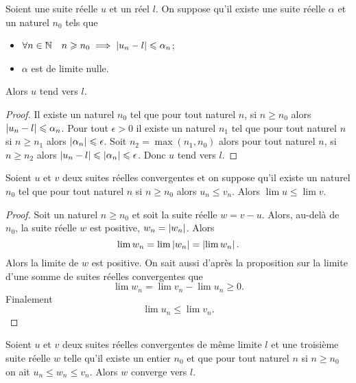 \begin{prop}
  Soient une suite réelle \(u\) et un réel \(l\). On suppose qu'il existe une suite réelle \(\alpha\) et un naturel \(n_0\) tels que
  \begin{itemize}
  \item \(\forall n \in \mathbb{N} \quad n \geqslant n_0 \implies \left\lvert u_n-l\right\rvert \leqslant \alpha_n\);
  \item \(\alpha\) est de limite nulle.
  \end{itemize}
  Alors \(u\) tend vers \(l\).
\end{prop}
\begin{proof}
  Il existe un naturel \(n_0\) tel que pour tout naturel \(n\), si \(n \geqslant n_0\) alors \(\left\lvert u_n-l\right\rvert \leqslant \alpha_n\). Pour tout \(\epsilon>0\) il existe un naturel \(n_1\) tel que pour tout naturel \(n\) si \(n\geqslant n_1\) alors \(\left\lvert\alpha_n\right\rvert \leqslant \epsilon\). Soit \(n_2=\max(n_1,n_0)\) alors pour tout naturel \(n\), si \(n \geqslant n_2\) alors \(\left\lvert u_n-l\right\rvert\leqslant \left\lvert\alpha_n\right\rvert\leqslant \epsilon\). Donc \(u\) tend vers \(l\).
\end{proof}
\begin{prop}
  Soient \(u\) et \(v\) deux suites réelles convergentes et on suppose qu'il existe un naturel \(n_0\) tel que pour tout naturel \(n\) si \(n \geqslant n_0\) alors \(u_n \leqslant v_n\). Alors \(\lim u \leqslant \lim v\).
\end{prop}
\begin{proof}
  Soit un naturel \(n \geqslant n_0\) et soit la suite réelle \(w=v-u\). Alors, au-delà de \(n_0\), la suite réelle \(w\) est positive, \(w_n=\left\lvert w_n\right\rvert\). Alors
  \begin{equation}
    \lim w_n=\lim \left\lvert w_n\right\rvert=\left\lvert\lim w_n\right\rvert.
  \end{equation}
Alors la limite de \(w\) est positive. On sait aussi d'après la proposition sur la limite d'une somme de suites réelles convergentes que
\begin{equation}
  \lim w_n = \lim v_n - \lim u_n \geqslant 0.
\end{equation}
Finalement
\begin{equation}
  \lim u_n \leqslant \lim v_n.
\end{equation}
\end{proof}
\begin{theo}
  Soient \(u\) et \(v\) deux suites réelles convergentes de même limite \(l\) et une troisième suite réelle \(w\) telle qu'il existe un entier \(n_0\) et que pour tout naturel \(n\) si \(n \geqslant n_0\) on ait \(u_n \leqslant w_n \leqslant v_n\). Alors \(w\) converge vers \(l\).
\end{theo}
